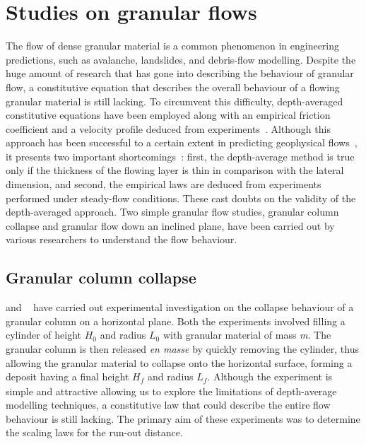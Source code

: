 \section{Studies on granular flows}
The flow of dense granular material is a common phenomenon in engineering 
predictions, such as avalanche, landslides, and debris-flow modelling. Despite 
the huge amount of research that has gone into describing the behaviour of 
granular flow, a constitutive equation that describes the overall behaviour of 
a flowing granular material is still lacking. To circumvent this difficulty, 
depth-averaged constitutive equations have been employed along with an 
empirical friction coefficient and a velocity profile deduced from 
experiments~\citep{Midi2004,Iverson2003,Pouliquen1999}. Although this approach 
has been successful to a certain extent in predicting geophysical 
flows~\citep{Pouliquen2002a, Hutter1995}, it presents two important 
shortcomings~\citep{Lajeunesse2005}: first, the depth-average method is true 
only if the thickness of the flowing layer is thin in comparison with the 
lateral dimension, and second, the empirical laws are deduced from experiments 
performed under steady-flow conditions. These cast doubts on the validity of 
the depth-averaged approach. Two simple granular flow studies, granular column 
collapse and granular flow down an inclined plane, have been carried out by 
various researchers to understand the flow behaviour.

\subsection{Granular column collapse}
\citet{Lube2005} and ~\citet{Lajeunesse2004} have carried out experimental 
investigation on the collapse behaviour of a granular column on a horizontal 
plane. Both the experiments involved filling a cylinder of height 
$\textit{H}_{\textit{0}}$ and radius $\textit{L}_{\textit{0}}$ with granular 
material of mass \textit{m}. The granular column is then released \textit{en 
masse} by quickly removing the cylinder, thus allowing the granular material to 
collapse onto the horizontal surface, forming a deposit having a final height 
$\textit{H}_{\textit{f}}$ and radius $\textit{L}_{\textit{f}}$. Although the 
experiment is simple and attractive allowing us to explore the limitations of 
depth-average modelling techniques, a constitutive law that could describe the 
entire flow behaviour is still lacking. The primary aim of these experiments 
was to determine the scaling laws for the run-out distance.


